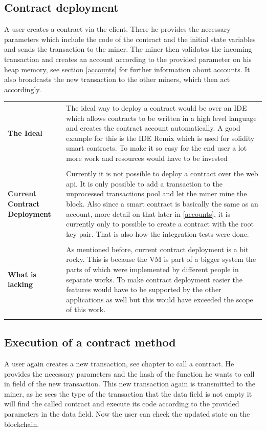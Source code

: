 \subsection{Contract deployment}
A user creates a contract via the client. There he provides the necessary parameters which include the code of the contract and the initial state variables and sends the transaction to the miner. The miner then validates the incoming transaction and creates an account according to the provided parameter on his heap memory, see section \ref{accounts} for further information about accounts. It also broadcasts the new transaction to the other miners, which then act accordingly.

\begin{tabular}[t]{ p{3cm} p{12.5cm}}
\raggedright
\textbf{The Ideal} &
The ideal way to deploy a contract would be over an IDE which allows contracts to be written in a high level language and creates the contract account automatically. A good example for this is the IDE Remix which is used for solidity smart contracts. To make it so easy for the end user a lot more work and resources would have to be invested \\ \\

\raggedright
\textbf{Current Contract Deployment} &
Currently it is not  possible to deploy a contract over the web api. It is only possible to add a transaction to the unprocessed transactions pool and let the miner mine the block. Also since a smart contract is basically the same as an account, more detail on that later in \ref{accounts}, it is currently only to possible to create a contract with the root key pair. That is also how the integration tests were done. \\ \\

\raggedright
\textbf{What is lacking} &
As mentioned before, current contract deployment is a bit rocky. This is because the VM is part of a bigger system the parts of which were implemented by different people in separate works. To make contract deployment easier the features would have to be supported by the other applications as well but this would have exceeded the scope of this work.
\\ \\
\end{tabular}

\subsection{Execution of a contract method}
A user again creates a new transaction, see chapter to call a contract. He provides the necessary parameters and the hash of the function he wants to call in field of the new transaction. This new transaction again is transmitted to the miner, as he sees the type of the transaction that the data field is not empty it will find the called contract and execute its code according to the provided parameters in the data field. Now the user can check the updated state on the blockchain. 

